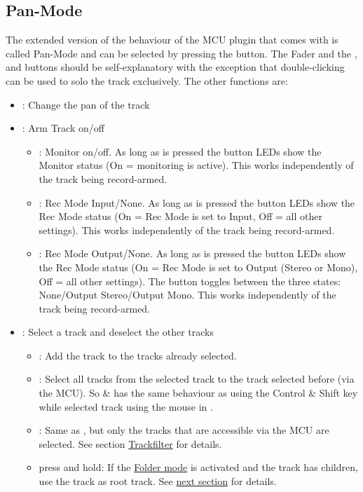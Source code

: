\subsection{Pan-Mode}\label{panmode} 
The extended version of the behaviour of the MCU plugin that comes
with \reaper is called Pan-Mode and can be selected by pressing the \pan
button. The Fader and the \vpots,  \mute and \solo buttons should be
self-explanatory with the exception that double-clicking \solo can be
used to solo the track exclusively. The other functions are:

\begin{itemize}
\item \vpots: Change the pan of the track

\item \rec: Arm Track on/off
        \bemod
        \begin{itemize}
        \item \shift: Monitor on/off. As long as \shift is pressed the
          \rec button LEDs show the Monitor status (On = monitoring
          is active). This works independently of the track being
          record-armed.
        \item \option: Rec Mode Input/None. As long as \option is
          pressed the \rec button LEDs show the Rec Mode status
          (On = Rec Mode is set to Input, Off = all other settings).
          This works independently of the track being record-armed.
        \item \alt: Rec Mode Output/None. As long as \alt is pressed
          the \rec button LEDs show the Rec Mode status (On = Rec
          Mode is set to Output (Stereo or Mono), Off = all other
          settings). The \rec button toggles between the three
          states: None/Output Stereo/Output Mono. This works
          independently of the track being record-armed.
        \end{itemize}
        
\item \select: Select a track and deselect the other tracks
        \bemod 
        \begin{itemize}
        \item \control: Add the track to the tracks already selected.
        \item \shift: Select all tracks from the selected track to the
          track selected before (via the MCU). So \control \& \shift
          has the same behaviour as using the Control \& Shift key
          while selected track using the mouse in \reaper.
        \item \alt: Same as \shift, but only the tracks that are
          accessible via the MCU are selected. See section
          \hyperref[trackfilter]{Trackfilter} for details.
        \item press and hold: If the \hyperref[foldermode]{Folder
            mode} is activated and the track has children, use the
          track as root track. See \hyperref[foldermode]{next
            section} for details.
        \end{itemize}


\end{itemize}
